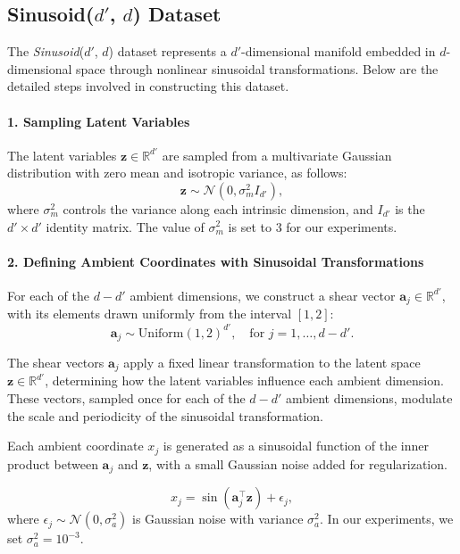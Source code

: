 \subsection{Sinusoid($d'$, $d$) Dataset}

The \textit{Sinusoid}($d'$, $d$) dataset represents a $d'$-dimensional manifold embedded in $d$-dimensional space through nonlinear sinusoidal transformations. Below are the detailed steps involved in constructing this dataset.

\paragraph{1. Sampling Latent Variables}

The latent variables $\mathbf{z} \in \mathbb{R}^{d'}$ are sampled from a multivariate Gaussian distribution with zero mean and isotropic variance, as follows:
\[
\mathbf{z} \sim \mathcal{N}\left( 0, \sigma_m^2 I_{d'} \right),
\]
where $\sigma_m^2$ controls the variance along each intrinsic dimension, and $I_{d'}$ is the $d' \times d'$ identity matrix. The value of $\sigma_m^2$ is set to 3 for our experiments.

\paragraph{2. Defining Ambient Coordinates with Sinusoidal Transformations}

For each of the $d-d'$ ambient dimensions, we construct a shear vector \( \mathbf{a}_j \in \mathbb{R}^{d'} \), with its elements drawn uniformly from the interval \([1, 2]\):
\[
\mathbf{a}_j \sim \text{Uniform}(1, 2)^{d'}, \quad \text{for } j = 1, \dots, d-d'.
\]

The shear vectors \( \mathbf{a}_j \) apply a fixed linear transformation to the latent space \( \mathbf{z} \in \mathbb{R}^{d'} \), determining how the latent variables influence each ambient dimension. These vectors, sampled once for each of the $d-d'$ ambient dimensions, modulate the scale and periodicity of the sinusoidal transformation.

Each ambient coordinate \( x_j \) is generated as a sinusoidal function of the inner product between \( \mathbf{a}_j \) and \( \mathbf{z} \), with a small Gaussian noise added for regularization.

\[
x_j = \sin\left( \mathbf{a}_j^\top \mathbf{z} \right) + \epsilon_j,
\]
where \( \epsilon_j \sim \mathcal{N}(0, \sigma_a^2) \) is Gaussian noise with variance \( \sigma_a^2 \). In our experiments, we set \( \sigma_a^2 = 10^{-3} \).

